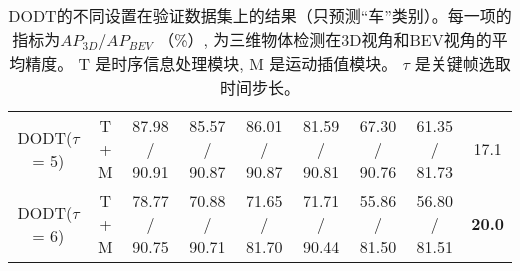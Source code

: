 \begin{table}
{\begin{tabular}{ccccccccc}
			\multicolumn{1}{c|}{DODT($\tau$ = 5)}     &\multicolumn{1}{c|}{T + M} & 87.98 / 90.91  & 85.57 / 90.87 & \multicolumn{1}{c|}{86.01 / 90.87}  & 81.59 / 90.81 & 67.30 / 90.76 & \multicolumn{1}{c|}{61.35 / 81.73}   & 17.1\\
			\multicolumn{1}{c|}{DODT($\tau$ = 6)}     &\multicolumn{1}{c|}{T + M} & 78.77 / 90.75  & 70.88 / 90.71 & \multicolumn{1}{c|}{71.65 / 81.70}  & 71.71 / 90.44 & 55.86 / 81.50 & \multicolumn{1}{c|}{56.80 / 81.51}   & \textbf{20.0} \\ \midrule
	\end{tabular}}
	\caption{DODT的不同设置在验证数据集上的结果（只预测“车”类别）。每一项的指标为$AP_{3D}/AP_{BEV}$ （\%）, 为三维物体检测在3D视角和BEV视角的平均精度。 T 是时序信息处理模块, M 是运动插值模块。 $\tau$ 是关键帧选取时间步长。} 
	\label{table:result_detection}
\end{table}

